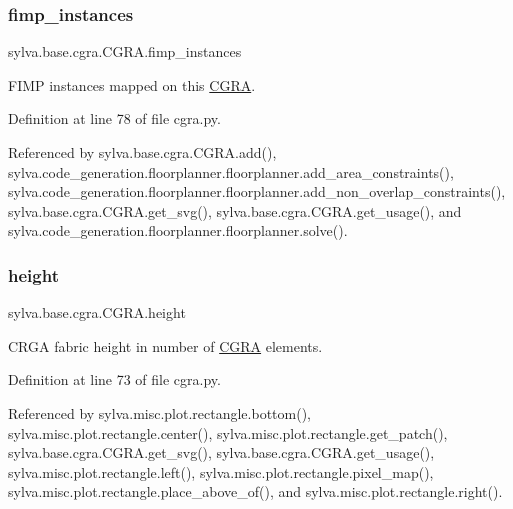 \subsubsection{\texorpdfstring{fimp\+\_\+instances}{fimp\_instances}}
{\footnotesize\ttfamily sylva.\+base.\+cgra.\+C\+G\+R\+A.\+fimp\+\_\+instances}



F\+I\+MP instances mapped on this \hyperlink{classsylva_1_1base_1_1cgra_1_1_c_g_r_a}{C\+G\+RA}. 



Definition at line 78 of file cgra.\+py.



Referenced by sylva.\+base.\+cgra.\+C\+G\+R\+A.\+add(), sylva.\+code\+\_\+generation.\+floorplanner.\+floorplanner.\+add\+\_\+area\+\_\+constraints(), sylva.\+code\+\_\+generation.\+floorplanner.\+floorplanner.\+add\+\_\+non\+\_\+overlap\+\_\+constraints(), sylva.\+base.\+cgra.\+C\+G\+R\+A.\+get\+\_\+svg(), sylva.\+base.\+cgra.\+C\+G\+R\+A.\+get\+\_\+usage(), and sylva.\+code\+\_\+generation.\+floorplanner.\+floorplanner.\+solve().

\mbox{\label{classsylva_1_1base_1_1cgra_1_1_c_g_r_a_ab60b2034fe9b4e7ec4495734e7e539ff}} 
\subsubsection{\texorpdfstring{height}{height}}
{\footnotesize\ttfamily sylva.\+base.\+cgra.\+C\+G\+R\+A.\+height}



C\+R\+GA fabric height in number of \hyperlink{classsylva_1_1base_1_1cgra_1_1_c_g_r_a}{C\+G\+RA} elements. 



Definition at line 73 of file cgra.\+py.



Referenced by sylva.\+misc.\+plot.\+rectangle.\+bottom(), sylva.\+misc.\+plot.\+rectangle.\+center(), sylva.\+misc.\+plot.\+rectangle.\+get\+\_\+patch(), sylva.\+base.\+cgra.\+C\+G\+R\+A.\+get\+\_\+svg(), sylva.\+base.\+cgra.\+C\+G\+R\+A.\+get\+\_\+usage(), sylva.\+misc.\+plot.\+rectangle.\+left(), sylva.\+misc.\+plot.\+rectangle.\+pixel\+\_\+map(), sylva.\+misc.\+plot.\+rectangle.\+place\+\_\+above\+\_\+of(), and sylva.\+misc.\+plot.\+rectangle.\+right().

